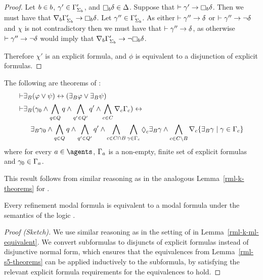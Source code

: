\begin{proof}
Let $b \in b$, $\gamma' \in \Gamma'_{\Sigma_b}$, and $\necessaryB \delta \in \Delta$.
Suppose that $\proves \gamma' \implies \necessaryB \delta$.
Then we must have that $\coversB \Gamma'_{\Sigma_\agentB} \implies \necessaryB \delta$.
Let $\gamma'' \in \Gamma'_{\Sigma_b}$.
As either $\vdash \gamma'' \rightarrow \delta$ or $\vdash \gamma'' \rightarrow \neg \delta$ and $\chi$ is not contradictory then we must have that $\vdash \gamma'' \rightarrow \delta$, as otherwise $\vdash \gamma'' \rightarrow \neg \delta$ would imply that $\coversB \Gamma'_{\Sigma_\agentB} \implies \neg \necessaryB \delta$.

Therefore $\chi'$ is an explicit formula, and $\phi$ is equivalent to a disjunction of explicit formulas.
\end{proof}

\begin{lemma}\label{rml-s5-theorems}
The following are theorems of \axiomRmlS{}:
\begin{align}
    \proves & \somerefsBs (\phi \lor \psi) \iff (\somerefsBs \phi \lor \somerefsBs \psi)\\
    \proves & \displaystyle \somerefsBs (\gamma_0 \land \bigwedge_{\atomQ \in \atomsQ} \atomQ \land \bigwedge_{\atomQ' \in \atomsQ'} \atomQ' \land \bigwedge_{\agentC \in \agentsC} \coverC \Gamma_\agentC) \iff \nonumber\\
            & \displaystyle \quad
            \somerefsBs \gamma_0 \land
            \bigwedge_{\atomQ \in \atomsQ} \atomQ \land \bigwedge_{\atomQ' \in \atomsQ'} \atomQ' \land 
            \bigwedge_{\agentC \in \agentsC \cap \agentsB} \bigwedge_{\gamma \in \Gamma_\agentC} \possibleC \somerefsBs \gamma \land
            \bigwedge_{\agentC \in \agentsC \setminus \agentsB} \coversC \{\somerefsBs \gamma \mid \gamma \in \Gamma_\agentC\}
\end{align}
where for every $\agentA \in \agents$, $\Gamma_a$ is a non-empty, finite set of explicit formulas and $\gamma_0 \in \Gamma_a$.
\end{lemma}

This result follows from similar reasoning as in the analogous Lemma~\ref{rml-k-theorems} for \axiomRmlK{}.

\begin{lemma}\label{rml-s5-ml-equivalent}
Every refinement modal formula is equivalent to a modal formula under the semantics of the logic \logicRmlS{}.
\end{lemma}

\begin{proof}[Proof (Sketch)]
We use similar reasoning as in the setting of \logicRmlK{} in Lemma~\ref{rml-k-ml-equivalent}.
We convert subformulas to disjuncts of explicit formulas instead of disjunctive normal form, which ensures that the equivalences from Lemma~\ref{rml-s5-theorems} can be applied inductively to the subformula, by satisfying the relevant explicit formula requirements for the equivalences to hold.
\end{proof}

